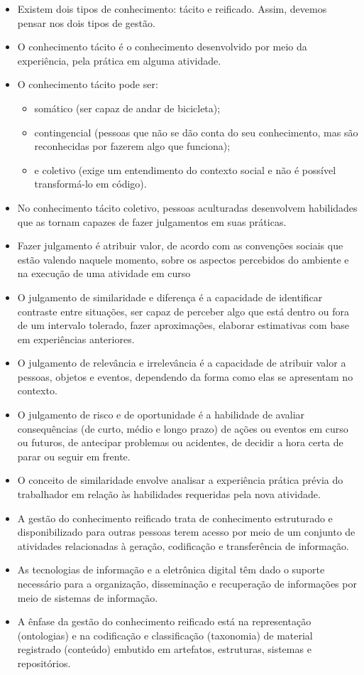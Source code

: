 \documentclass{article}
\begin{document}
\begin{itemize}
    \item Existem dois tipos de conhecimento: tácito e reificado. Assim, devemos pensar nos dois tipos de gestão.
    \item O conhecimento tácito é o conhecimento desenvolvido por meio da experiência, pela prática em alguma atividade.
    \item O conhecimento tácito pode ser: 
    \begin{itemize}
        \item somático (ser capaz de andar de bicicleta); 
        \item contingencial (pessoas que não se dão conta do seu conhecimento, mas são reconhecidas por fazerem algo que funciona); 
        \item e coletivo (exige um entendimento do contexto social e não é possível transformá-lo em código).
    \end{itemize}
    \item No conhecimento tácito coletivo, pessoas aculturadas desenvolvem habilidades que as tornam capazes de fazer julgamentos em suas práticas.
    \item Fazer julgamento é atribuir valor, de acordo com as convenções sociais que estão valendo naquele momento, sobre os aspectos percebidos do ambiente e na execução de uma atividade em curso
    \item O julgamento de similaridade e diferença é a capacidade de identificar contraste entre situações, ser capaz de perceber algo que está dentro ou fora de um intervalo tolerado, fazer aproximações, elaborar estimativas com base em experiências anteriores.
    \item O julgamento de relevância e irrelevância é a capacidade de atribuir valor a pessoas, objetos e eventos, dependendo da forma como elas se apresentam no contexto.
    \item O julgamento de risco e de oportunidade é a habilidade de avaliar consequências (de curto, médio e longo prazo) de ações ou eventos em curso ou futuros, de antecipar problemas ou acidentes, de decidir a hora certa de parar ou seguir em frente.
    \item O conceito de similaridade envolve analisar a experiência prática prévia do trabalhador em relação às habilidades requeridas pela nova atividade.
    \item A gestão do conhecimento reificado trata de conhecimento estruturado e disponibilizado para outras pessoas terem acesso por meio de um conjunto de atividades relacionadas à geração, codificação e transferência de informação.
    \item As tecnologias de informação e a eletrônica digital têm dado o suporte necessário para a organização, disseminação e recuperação de informações por meio de sistemas de informação.
    \item A ênfase da gestão do conhecimento reificado está na representação (ontologias) e na codificação e classificação (taxonomia) de material registrado (conteúdo) embutido em artefatos, estruturas, sistemas e repositórios.
\end{itemize}
\end{document}
